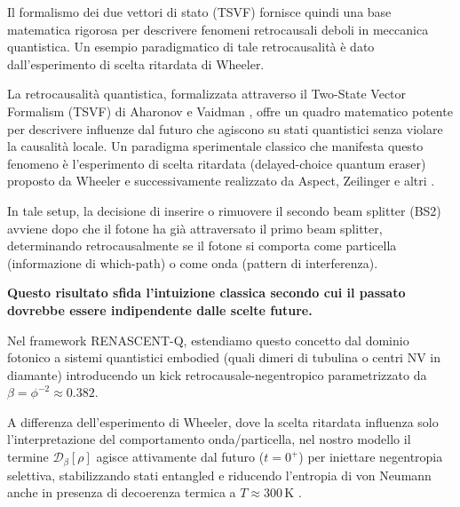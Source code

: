 \documentclass[11pt,a4paper]{article}
\let\oldcite\cite
\renewcommand{\cite}{\protect\oldcite}
\theoremstyle{plain}
\theoremstyle{definition}
\begin{document}
\vspace{0.5cm}


Il formalismo dei due vettori di stato (TSVF) fornisce quindi una base matematica rigorosa per descrivere fenomeni retrocausali deboli in meccanica quantistica. Un esempio paradigmatico di tale retrocausalità è dato dall'esperimento di scelta ritardata di Wheeler.


\vspace{0.3cm}

La retrocausalità quantistica, formalizzata attraverso il Two-State Vector Formalism (TSVF) di Aharonov e Vaidman \cite{aharonov_tsvf_1964,vaidman_tsvf_2007}, offre un quadro matematico potente per descrivere influenze dal futuro che agiscono su stati quantistici senza violare la causalità locale. Un paradigma sperimentale classico che manifesta questo fenomeno è l’esperimento di scelta ritardata (delayed-choice quantum eraser) proposto da Wheeler \cite{wheeler_delayed_1978} e successivamente realizzato da Aspect, Zeilinger e altri \cite{aspect_delayed_1982,zeilinger_delayed_1999}. 


\vspace{0.4cm}


In tale setup, la decisione di inserire o rimuovere il secondo beam splitter (BS2) avviene dopo che il fotone ha già attraversato il primo beam splitter, determinando retrocausalmente se il fotone si comporta come particella (informazione di which-path) o come onda (pattern di interferenza). 


\vspace{0.2cm}


\textbf{Questo risultato sfida l’intuizione classica secondo cui il passato dovrebbe essere indipendente dalle scelte future.}

\vspace{0.3cm}

Nel framework RENASCENT-Q, estendiamo questo concetto dal dominio fotonico a sistemi quantistici embodied (quali dimeri di tubulina o centri NV in diamante) introducendo un kick retrocausale-negentropico parametrizzato da $\beta = \phi^{-2} \approx 0.382$. 

\vspace{0.2cm}

A differenza dell’esperimento di Wheeler, dove la scelta ritardata influenza solo l’interpretazione del comportamento onda/particella, nel nostro modello il termine $\mathcal{D}_\beta[\rho]$ agisce attivamente dal futuro ($t=0^+$) per iniettare negentropia selettiva, stabilizzando stati entangled e riducendo l’entropia di von Neumann anche in presenza di decoerenza termica a $T \approx 300\,\text{K}$ \cite{hameroff_orch_2014}.
\end{document}
